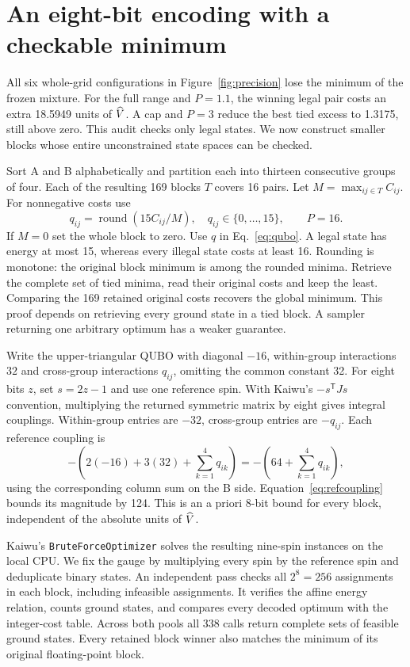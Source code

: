 \section{An eight-bit encoding with a checkable minimum}
All six whole-grid configurations in Figure~\ref{fig:precision} lose the minimum of the frozen mixture. For the full range and $P=1.1$, the winning legal pair costs an extra 18.5949 units of $\widehat V$. A cap and $P=3$ reduce the best tied excess to 1.3175, still above zero. This audit checks only legal states. We now construct smaller blocks whose entire unconstrained state spaces can be checked.

Sort A and B alphabetically and partition each into thirteen consecutive groups of four. Each of the resulting 169 blocks $T$ covers 16 pairs. Let $M=\max_{ij\in T} C_{ij}$. For nonnegative costs use
\begin{equation}
 q_{ij}=\operatorname{round}(15C_{ij}/M),\quad
 q_{ij}\in\{0,\ldots,15\},\qquad P=16. \label{eq:bins}
\end{equation}
If $M=0$ set the whole block to zero. Use $q$ in Eq.~\eqref{eq:qubo}. A legal state has energy at most 15, whereas every illegal state costs at least 16. Rounding is monotone: the original block minimum is among the rounded minima. Retrieve the complete set of tied minima, read their original costs and keep the least. Comparing the 169 retained original costs recovers the global minimum. This proof depends on retrieving every ground state in a tied block. A sampler returning one arbitrary optimum has a weaker guarantee.

Write the upper-triangular QUBO with diagonal $-16$, within-group interactions $32$ and cross-group interactions $q_{ij}$, omitting the common constant 32. For eight bits $z$, set $s=2z-1$ and use one reference spin. With Kaiwu's $-s^\mathsf{T}Js$ convention, multiplying the returned symmetric matrix by eight gives integral couplings. Within-group entries are $-32$, cross-group entries are $-q_{ij}$. Each reference coupling is
\begin{equation}
 -\left(2(-16)+3(32)+\sum_{k=1}^4 q_{ik}\right)
 =-\left(64+\sum_{k=1}^4 q_{ik}\right), \label{eq:refcoupling}
\end{equation}
using the corresponding column sum on the B side. Equation~\eqref{eq:refcoupling} bounds its magnitude by 124. This is an a priori 8-bit bound for every block, independent of the absolute units of $\widehat V$.

Kaiwu's \texttt{BruteForceOptimizer} solves the resulting nine-spin instances on the local CPU. We fix the gauge by multiplying every spin by the reference spin and deduplicate binary states. An independent pass checks all $2^8=256$ assignments in each block, including infeasible assignments. It verifies the affine energy relation, counts ground states, and compares every decoded optimum with the integer-cost table. Across both pools all 338 calls return complete sets of feasible ground states. Every retained block winner also matches the minimum of its original floating-point block.


